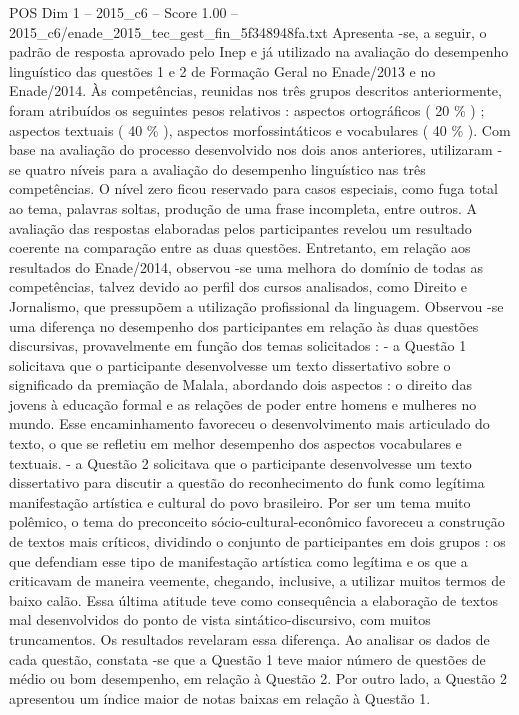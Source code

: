 \begin{textsample}{POS Dim 1 – 2015\_c6 – Score 1.00 – 2015\_c6/enade\_2015\_tec\_gest\_fin\_5f348948fa.txt}
Apresenta -se, a seguir, o padrão de resposta aprovado pelo Inep e já utilizado na avaliação do desempenho linguístico das questões 1 e 2 de Formação Geral no Enade/2013 e no Enade/2014.
Às competências, reunidas nos três grupos descritos anteriormente, foram atribuídos os seguintes pesos relativos : aspectos ortográficos ( 20 \% ) ; aspectos textuais ( 40 \% ), aspectos morfossintáticos e vocabulares ( 40 \% ).
Com base na avaliação do processo desenvolvido nos dois anos anteriores, utilizaram -se quatro níveis para a avaliação do desempenho linguístico nas três competências.
O nível zero ficou reservado para casos especiais, como fuga total ao tema, palavras soltas, produção de uma frase incompleta, entre outros.
A avaliação das respostas elaboradas pelos participantes revelou um resultado coerente na comparação entre as duas questões.
Entretanto, em relação aos resultados do Enade/2014, observou -se uma melhora do domínio de todas as competências, talvez devido ao perfil dos cursos analisados, como Direito e Jornalismo, que pressupõem a utilização profissional da linguagem.
Observou -se uma diferença no desempenho dos participantes em relação às duas questões discursivas, provavelmente em função dos temas solicitados : - a Questão 1 solicitava que o participante desenvolvesse um texto dissertativo sobre o significado da premiação de Malala, abordando dois aspectos : o direito das jovens à educação formal e as relações de poder entre homens e mulheres no mundo.
Esse encaminhamento favoreceu o desenvolvimento mais articulado do texto, o que se refletiu em melhor desempenho dos aspectos vocabulares e textuais. - a Questão 2 solicitava que o participante desenvolvesse um texto dissertativo para discutir a questão do reconhecimento do funk como legítima manifestação artística e cultural do povo brasileiro.
Por ser um tema muito polêmico, o tema do preconceito sócio-cultural-econômico favoreceu a construção de textos mais críticos, dividindo o conjunto de participantes em dois grupos : os que defendiam esse tipo de manifestação artística como legítima e os que a criticavam de maneira veemente, chegando, inclusive, a utilizar muitos termos de baixo calão.
Essa última atitude teve como consequência a elaboração de textos mal desenvolvidos do ponto de vista sintático-discursivo, com muitos truncamentos.
Os resultados revelaram essa diferença.
Ao analisar os dados de cada questão, constata -se que a Questão 1 teve maior número de questões de médio ou bom desempenho, em relação à Questão 2.
Por outro lado, a Questão 2 apresentou um índice maior de notas baixas em relação à Questão 1.

\end{textsample}
